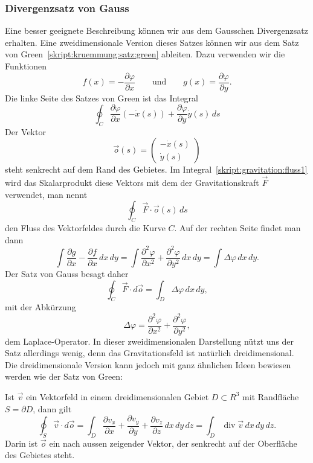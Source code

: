 \subsubsection{Divergenzsatz von Gauss}
Eine besser geeignete Beschreibung können wir aus dem Gausschen
Divergenzsatz erhalten.
Eine zweidimensionale Version dieses Satzes können wir
aus dem Satz von Green~\eqref{skript:kruemmung:satz:green}
ableiten.
Dazu verwenden wir die Funktionen 
\[
f(x)=-\frac{\partial \varphi}{\partial x}
\qquad\text{und}\qquad
g(x)=\frac{\partial \varphi}{\partial y}.
\]
Die linke Seite des Satzes von Green ist das Integral
\begin{equation}
\oint_{C}
\frac{\partial \varphi}{\partial x} (-\dot x(s))
+
\frac{\partial \varphi}{\partial y} \dot y(s)
\,ds
\label{skript:gravitation:fluss1}
\end{equation}
Der Vektor
\[
\vec o(s) = \begin{pmatrix}-\dot x(s)\\\dot y(s)\end{pmatrix}
\]
steht senkrecht auf dem Rand des Gebietes.
Im Integral~\eqref{skript:gravitation:fluss1} wird das Skalarprodukt
diese Vektors mit dem der Gravitationskraft $\vec F$ verwendet,
man nennt
\[
\oint_{C} \vec F\cdot \vec o(s)\,ds
\]
den Fluss des Vektorfeldes durch die Kurve $C$.
Auf der rechten Seite findet man dann 
\[
\int \frac{\partial g}{\partial x}-\frac{\partial f}{\partial x}\,dx\,dy
=
\int
\frac{\partial^2\varphi}{\partial x^2}
+
\frac{\partial^2\varphi}{\partial y^2}
\,dx\,dy
=
\int\Delta\varphi \,dx\,dy.
\]
Der Satz von Gauss besagt daher
\[
\oint_{C} \vec F\cdot d\vec o
=
\int_{D} \Delta\varphi\,dx\,dy,
\]
mit der Abkürzung
\begin{equation*}
\Delta \varphi
=
\frac{\partial^2\varphi}{\partial x^2}+
\frac{\partial^2\varphi}{\partial y^2},
\end{equation*}
dem Laplace-Operator.
In dieser zweidimensionalen Darstellung nützt uns der Satz allerdings
wenig, denn das Gravita\-tions\-feld ist natürlich dreidimensional.
Die dreidimensionale Version kann jedoch mit ganz ähnlichen Ideen
bewiesen werden wie der Satz von Green:

\begin{satz}[Gauss]
\label{skript:gravitation:gausssatz}
Ist $\vec v$ ein Vektorfeld in
einem dreidimensionalen Gebiet $D\subset R^3$ mit Randfläche $S=\partial D$,
dann gilt
\begin{equation}
\oint_S \vec v\cdot d\vec o
=
\int_D 
\frac{\partial v_x}{\partial x}
+
\frac{\partial v_y}{\partial y}
+
\frac{\partial v_z}{\partial z}
\,dx\,dy\,dz
=
\int_D \operatorname{div}\vec v\,dx\,dy\,dz.
\label{skript:gravitation:gausssatzf}
\end{equation}
Darin ist $\vec o$ ein nach aussen zeigender Vektor, der
senkrecht auf der Oberfläche des Gebietes steht.
\end{satz}

